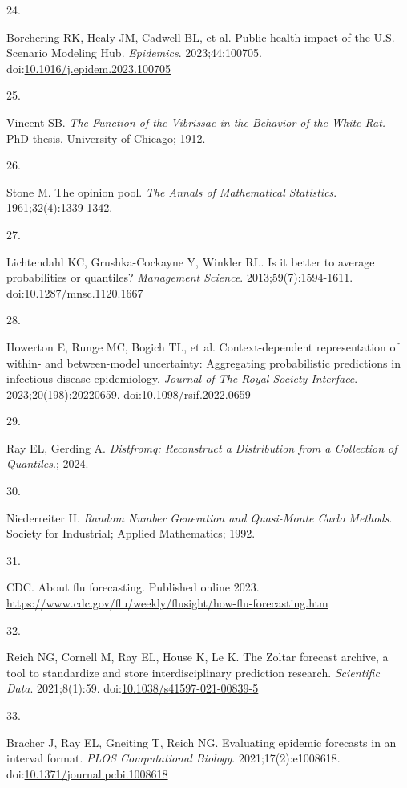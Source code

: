 \documentclass[
  letterpaper,
  DIV=11,
  numbers=noendperiod]{scrartcl}
\newlength{\cslhangindent}
\newlength{\csllabelwidth}
\newenvironment{CSLReferences}[2] %
 {\begin{list}{}{%
  \setlength{\itemindent}{0pt}
  \setlength{\leftmargin}{0pt}
  \setlength{\parsep}{0pt}
  \ifodd #1
   \setlength{\leftmargin}{\cslhangindent}
   \setlength{\itemindent}{-1\cslhangindent}
  \fi
  \setlength{\itemsep}{#2\baselineskip}}}
 {\end{list}}
\newcommand{\CSLLeftMargin}[1]{\parbox[t]{\csllabelwidth}{\strut#1\strut}}
\newcommand{\CSLRightInline}[1]{\parbox[t]{\linewidth - \csllabelwidth}{\strut#1\strut}}
\begin{document}
\begin{CSLReferences}{0}{1}
\CSLLeftMargin{24. }%
\CSLRightInline{Borchering RK, Healy JM, Cadwell BL, et al. Public
health impact of the {U}.{S}. {Scenario} {Modeling} {Hub}.
\emph{Epidemics}. 2023;44:100705.
doi:\href{https://doi.org/10.1016/j.epidem.2023.100705}{10.1016/j.epidem.2023.100705}}

\CSLLeftMargin{25. }%
\CSLRightInline{Vincent SB. \emph{The Function of the Vibrissae in the
Behavior of the White Rat.} PhD thesis. University of Chicago; 1912.}

\CSLLeftMargin{26. }%
\CSLRightInline{Stone M. The opinion pool. \emph{The Annals of
Mathematical Statistics}. 1961;32(4):1339-1342.}

\CSLLeftMargin{27. }%
\CSLRightInline{Lichtendahl KC, Grushka-Cockayne Y, Winkler RL. Is it
better to average probabilities or quantiles? \emph{Management Science}.
2013;59(7):1594-1611.
doi:\href{https://doi.org/10.1287/mnsc.1120.1667}{10.1287/mnsc.1120.1667}}

\CSLLeftMargin{28. }%
\CSLRightInline{Howerton E, Runge MC, Bogich TL, et al.
Context-dependent representation of within- and between-model
uncertainty: Aggregating probabilistic predictions in infectious disease
epidemiology. \emph{Journal of The Royal Society Interface}.
2023;20(198):20220659.
doi:\href{https://doi.org/10.1098/rsif.2022.0659}{10.1098/rsif.2022.0659}}

\CSLLeftMargin{29. }%
\CSLRightInline{Ray EL, Gerding A. \emph{Distfromq: Reconstruct a
Distribution from a Collection of Quantiles}.; 2024.}

\CSLLeftMargin{30. }%
\CSLRightInline{Niederreiter H. \emph{Random Number Generation and
Quasi-Monte Carlo Methods}. Society for Industrial; Applied Mathematics;
1992.}

\CSLLeftMargin{31. }%
\CSLRightInline{CDC. About flu forecasting. Published online 2023.
\url{https://www.cdc.gov/flu/weekly/flusight/how-flu-forecasting.htm}}

\CSLLeftMargin{32. }%
\CSLRightInline{Reich NG, Cornell M, Ray EL, House K, Le K. The {Zoltar}
forecast archive, a tool to standardize and store interdisciplinary
prediction research. \emph{Scientific Data}. 2021;8(1):59.
doi:\href{https://doi.org/10.1038/s41597-021-00839-5}{10.1038/s41597-021-00839-5}}

\CSLLeftMargin{33. }%
\CSLRightInline{Bracher J, Ray EL, Gneiting T, Reich NG. Evaluating
epidemic forecasts in an interval format. \emph{PLOS Computational
Biology}. 2021;17(2):e1008618.
doi:\href{https://doi.org/10.1371/journal.pcbi.1008618}{10.1371/journal.pcbi.1008618}}

\end{CSLReferences}
\end{document}

